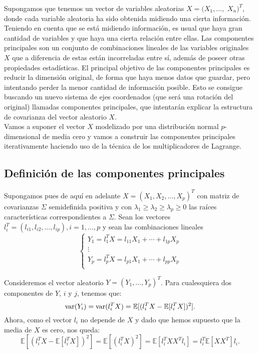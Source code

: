 Supongamos que tenemos un vector de variables aleatorias $X =  (X_1, \dots ,$ $X_n)^T$, donde cada variable aleatoria ha sido obtenida midiendo una cierta información. Teniendo en cuenta que se está midiendo información, es usual que haya gran cantidad de variables y que haya una cierta relación entre ellas. Las componentes principales son un conjunto de combinaciones lineales de las variables originales $X$ que a diferencia de estas están incorreladas entre sí, además de poseer otras propiedades estadísticas. El principal objetivo de las componentes principales es reducir la dimensión original, de forma que haya menos datos que guardar, pero intentando perder la menor cantidad de información posible. Esto se consigue buscando un nuevo sistema de ejes coordenados (que será una rotación del original) llamadas componentes principales, que intentarán explicar la estructura de covarianza del vector aleatorio $X$.\\

Vamos a suponer el vector $X$ modelizado por una distribución normal $p$-dimensional de media cero y vamos a construir las componentes principales iterativamente haciendo uso de la técnica de los multiplicadores de Lagrange.\\

\subsection{Definición de las componentes principales}

Supongamos pues de aquí en adelante $X = (X_1, X_2, \dots, X_p)^T$ con matriz de covarianzas $\Sigma$ semidefinida positiva y con $\lambda_1 \geq \lambda_2 \geq \lambda_p \geq 0$ las raíces características correspondientes a $\Sigma$. Sean los vectores $l_i^T = (l_{i1}, l_{i2}, \dots, l_{ip}), i=1,\dots,p$ y sean las combinaciones lineales 
\begin{equation*}
  \left\lbrace
  \begin{array}{l}
     Y_1 = l_1^TX = l_{11}X_1 + \cdots + l_{1p}X_p \\
     \vdots \\
     Y_p = l_p^TX = l_{p1}X_1 + \cdots + l_{pp}X_p \\
  \end{array}
  \right.
\end{equation*}

Consideremos el vector aleatorio $Y=(Y_1, \dots, Y_p)^T$. Para cualesquiera dos componentes de $Y$, $i$ y $j$, tenemos que:
\[	\text{var}{(Y_i)} = \text{var}{(l_i^TX)} = \mathbb{E}[(l_i^TX - \mathbb{E}[l_i^TX])^2]. \]
Ahora, como el vector $l_i$ no depende de $X$ y dado que hemos supuesto que la media de $X$ es cero, nos queda:
\[	\mathbb{E}[(l_i^TX - \mathbb{E}[l_i^TX])^2] = \mathbb{E}[(l_i^TX)^2] = \mathbb{E}[l_i^TXX^Tl_i] = l_i^T \mathbb{E}[XX^T] l_i. \] 


